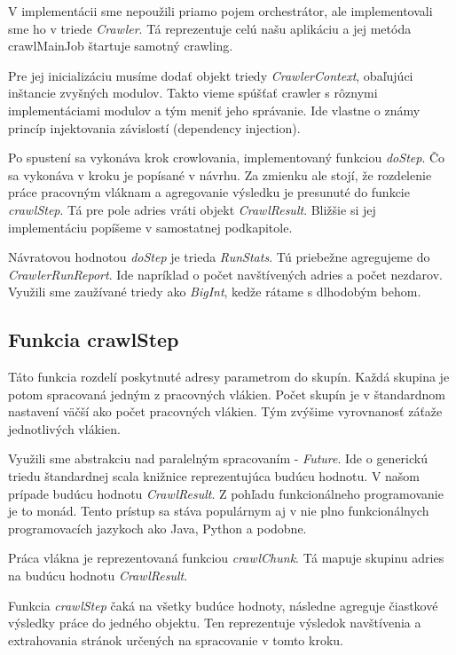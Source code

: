 V implementácii sme nepoužili priamo pojem orchestrátor, ale implementovali sme ho v triede \textit{Crawler}. Tá reprezentuje celú našu aplikáciu a jej metóda {crawlMainJob} štartuje samotný crawling. 

Pre jej inicializáciu musíme dodať objekt triedy \textit{CrawlerContext}, obaľujúci inštancie zvyšných modulov. Takto vieme spúšťať crawler s rôznymi implementáciami modulov a tým meniť jeho správanie. Ide vlastne o známy princíp injektovania závislostí (dependency injection).

Po spustení sa vykonáva krok crowlovania, implementovaný funkciou \textit{doStep}. Čo sa vykonáva v kroku je popísané v návrhu. Za zmienku ale stojí, že rozdelenie práce pracovným vláknam a agregovanie výsledku je presunuté do funkcie \textit{crawlStep}. Tá pre pole adries vráti objekt \textit{CrawlResult}. Bližšie si jej implementáciu popíšeme v samostatnej podkapitole. 

Návratovou hodnotou \textit{doStep} je trieda \textit{RunStats}. Tú priebežne agregujeme do \textit{CrawlerRunReport}. Ide napríklad o počet navštívených adries a počet nezdarov. Využili sme zaužívané triedy ako \textit{BigInt}, kedže rátame s dlhodobým behom. 

\subsection{Funkcia crawlStep}
Táto funkcia rozdelí poskytnuté adresy parametrom do skupín. Každá skupina je potom spracovaná jedným z pracovných vlákien. Počet skupín je v štandardnom nastavení väčší ako počet pracovných vlákien. Tým zvýšime vyrovnanosť záťaže jednotlivých vlákien.

Využili sme abstrakciu nad paralelným spracovaním - \textit{Future}. Ide o generickú triedu štandardnej scala knižnice reprezentujúca budúcu hodnotu. V našom prípade budúcu hodnotu \textit{CrawlResult}. Z pohľadu funkcionálneho programovanie je to monád. Tento prístup sa stáva populárnym aj v nie plno funkcionálnych programovacích jazykoch ako Java, Python a podobne. 

Práca vlákna je reprezentovaná funkciou \textit{crawlChunk}. Tá mapuje skupinu adries na budúcu hodnotu \textit{CrawlResult}. 

Funkcia \textit{crawlStep} čaká na všetky budúce hodnoty, následne agreguje čiastkové výsledky práce do jedného objektu. Ten reprezentuje výsledok navštívenia a extrahovania stránok určených na spracovanie v tomto kroku. 

